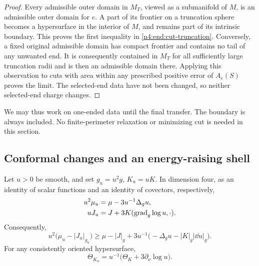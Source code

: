 \begin{proof}
Every admissible outer domain in \(M_T\), viewed as a submanifold of
\(M\), is an admissible outer domain for \(e\). A part of its frontier
on a truncation sphere becomes a hypersurface in the interior of \(M\),
and remains part of its intrinsic boundary. This proves the first
inequality in \eqref{n4:end:cut-truncation}. Conversely, a fixed original
admissible domain has compact frontier and contains no tail of any
unwanted end. It is consequently contained in \(M_T\) for all
sufficiently large truncation radii and is then an admissible domain
there. Applying this observation to cuts with area within any prescribed
positive error of \(A_e(S)\) proves the limit. The selected-end data have
not been changed, so neither selected-end charge changes.
\end{proof}

We may thus work on one-ended data until the final transfer. The boundary
is always included. No finite-perimeter relaxation or minimizing cut is
needed in this section.

\subsection{Conformal changes and an energy-raising shell}

\begin{lemma}\label{n4:lem:conformal}
Let \(u>0\) be smooth, and set \(g_u=u^2g\), \(K_u=uK\). In dimension
four, as an identity of scalar functions and an identity of covectors,
respectively,
\begin{align}
 u^2\mu_u&=\mu-3u^{-1}\Delta_g u,\label{n4:end:conformal-mu}\\
 uJ_u&=J+3K(\operatorname{grad}_g\log u,\cdot).\label{n4:end:conformal-J}
\end{align}
Consequently,
\begin{equation}\label{n4:end:conformal-dec}
 u^2\bigl(\mu_u-|J_u|_{g_u}\bigr)
 \ge \mu-|J|_g+3u^{-1}
          \bigl(-\Delta_g u-|K|_g|\dd u|_g\bigr).
\end{equation}
For any consistently oriented hypersurface,
\begin{equation}\label{n4:end:conformal-expansion}
 \Theta_{K_u}=u^{-1}
       \bigl(\Theta_K+3\partial_\nu\log u\bigr).
\end{equation}
\end{lemma}

